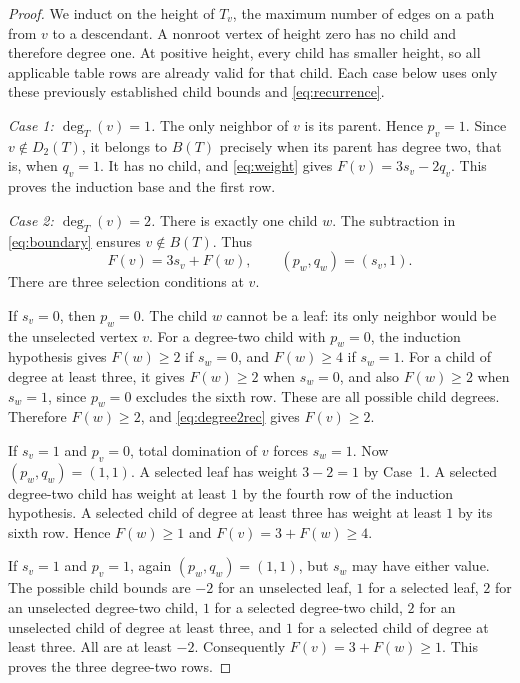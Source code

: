 \documentclass[11pt,a4paper]{article}
\theoremstyle{remark}
\newcommand{\BB}{B}
\begin{document}
\begin{proof}
We induct on the height of $T_v$, the maximum number of edges
on a path from $v$ to a descendant. A nonroot vertex of
height zero has no child and therefore degree one. At positive
height, every child has smaller height, so all applicable table rows
are already valid for that child. Each case below uses only
these previously established child bounds and \eqref{eq:recurrence}.

\smallskip\noindent\emph{Case 1: $\deg_T(v)=1$.}
The only neighbor of $v$ is its parent. Hence $p_v=1$.
Since $v\notin D_2(T)$, it belongs to $\BB(T)$ precisely when its
parent has degree two, that is, when $q_v=1$. It has no child, and
\eqref{eq:weight} gives $F(v)=3s_v-2q_v$. This proves
the induction base and the first row.

\smallskip\noindent\emph{Case 2: $\deg_T(v)=2$.}
There is exactly one child $w$. The subtraction in
\eqref{eq:boundary} ensures $v\notin\BB(T)$. Thus
\begin{equation}\label{eq:degree2rec}
 F(v)=3s_v+F(w),\qquad (p_w,q_w)=(s_v,1).
\end{equation}
There are three selection conditions at $v$.

If $s_v=0$, then $p_w=0$. The child $w$ cannot be a leaf: its only
neighbor would be the unselected vertex $v$. For a degree-two child
with $p_w=0$, the induction hypothesis gives $F(w)\ge 2$ if
$s_w=0$, and $F(w)\ge 4$ if $s_w=1$. For a child of degree at least
three, it gives $F(w)\ge 2$ when $s_w=0$, and also $F(w)\ge 2$
when $s_w=1$, since $p_w=0$ excludes the sixth row.
These are all possible child degrees. Therefore $F(w)\ge 2$, and
\eqref{eq:degree2rec} gives $F(v)\ge 2$.

If $s_v=1$ and $p_v=0$, total domination of $v$ forces $s_w=1$.
Now $(p_w,q_w)=(1,1)$. A selected leaf has weight $3-2=1$ by
Case~1. A selected degree-two child has weight at least $1$ by the
fourth row of the induction hypothesis. A selected child of degree
at least three has weight at least $1$ by its sixth row. Hence
$F(w)\ge 1$ and $F(v)=3+F(w)\ge 4$.

If $s_v=1$ and $p_v=1$, again $(p_w,q_w)=(1,1)$, but $s_w$ may
have either value. The possible child bounds are $-2$ for an
unselected leaf, $1$ for a selected leaf, $2$ for an unselected
degree-two child, $1$ for a selected degree-two child, $2$ for an
unselected child of degree at least three, and $1$ for a selected
child of degree at least three. All are at least $-2$.
Consequently $F(v)=3+F(w)\ge 1$. This proves the three degree-two rows.


\end{proof}
\end{document}
